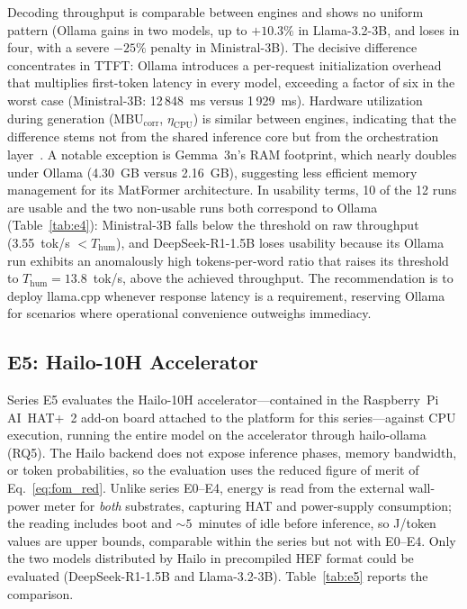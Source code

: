 \documentclass[acmsmall,natbib=false]{acmart}
\begin{document}
Decoding throughput is comparable between engines and shows no uniform
pattern (Ollama gains in two models, up to $+10.3\%$ in Llama-3.2-3B, and
loses in four, with a severe $-25\%$ penalty in Ministral-3B). The decisive
difference concentrates in TTFT: Ollama introduces a per-request
initialization overhead that multiplies first-token latency in every model,
exceeding a factor of six in the worst case (Ministral-3B: 12\,848~ms versus
1\,929~ms). Hardware utilization during generation
($\mathrm{MBU}_{\mathrm{corr}}$, $\eta_{\mathrm{CPU}}$) is similar between
engines, indicating that the difference stems not from the shared inference
core but from the orchestration layer~\cite{Github_Issue_Ollama}. A notable
exception is Gemma~3n's RAM footprint, which nearly doubles under Ollama
(4.30~GB versus 2.16~GB), suggesting less efficient memory management for its
MatFormer architecture. In usability terms, 10 of the 12 runs are usable and
the two non-usable runs both correspond to Ollama
(Table~\ref{tab:e4}): Ministral-3B falls below the threshold on raw
throughput (3.55~tok/s $< T_{\mathrm{hum}}$), and DeepSeek-R1-1.5B loses
usability because its Ollama run exhibits an anomalously high
tokens-per-word ratio that raises its threshold to
$T_{\mathrm{hum}}=13.8$~tok/s, above the achieved throughput. The
recommendation is to deploy llama.cpp
whenever response latency is a requirement, reserving Ollama for scenarios
where operational convenience outweighs immediacy.

\subsection{E5: Hailo-10H Accelerator}\label{sec:results_e5}

Series E5 evaluates the Hailo-10H accelerator---contained in the
Raspberry~Pi AI~HAT+~2 add-on board attached to the platform for this
series---against CPU execution, running the entire model on the accelerator
through hailo-ollama (RQ5). The Hailo
backend does not expose inference phases, memory bandwidth, or token
probabilities, so the evaluation uses the reduced figure of merit of
Eq.~\eqref{eq:fom_red}. Unlike series E0--E4, energy is read from the
external wall-power meter for \emph{both} substrates, capturing HAT and
power-supply consumption; the reading includes boot and ${\sim}5$~minutes of
idle before inference, so J/token values are upper bounds, comparable within
the series but not with E0--E4. Only the two models distributed by Hailo in
precompiled HEF format could be evaluated (DeepSeek-R1-1.5B and
Llama-3.2-3B). Table~\ref{tab:e5} reports the comparison.
\end{document}
